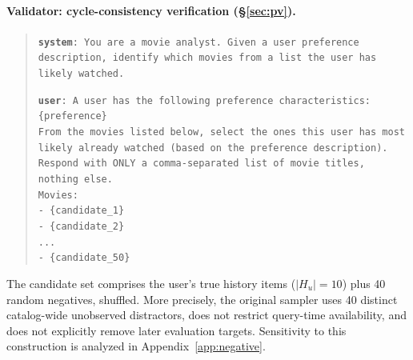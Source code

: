 \documentclass[11pt]{article}
\begin{document}
\paragraph{Validator: cycle-consistency verification
(\S\ref{sec:pv}).}
\begin{quote}
\small
\texttt{\textbf{system}: You are a movie analyst. Given a user
preference description, identify which movies from a list the user
has likely watched.}

\texttt{\textbf{user}: A user has the following preference
characteristics:}\\
\texttt{\{preference\}}\\
\texttt{From the movies listed below, select the ones this user has
most likely already watched (based on the preference description).
Respond with ONLY a comma-separated list of movie titles, nothing
else.}\\
\texttt{Movies:}\\
\texttt{- \{candidate\_1\}}\\
\texttt{- \{candidate\_2\}}\\
\texttt{...}\\
\texttt{- \{candidate\_50\}}
\end{quote}
The candidate set comprises the user's true history items ($|H_u| = 10$) plus 40 random negatives, shuffled. More precisely, the original sampler uses 40 distinct catalog-wide unobserved distractors, does not restrict query-time availability, and does not explicitly remove later evaluation targets. Sensitivity to this construction is analyzed in Appendix~\ref{app:negative}.
\end{document}
